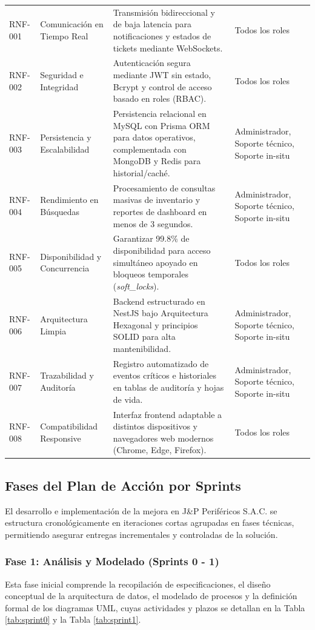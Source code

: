 \begin{longtable}{@{} >{\raggedright\arraybackslash}p{1.6cm} >{\raggedright\arraybackslash}p{2.9cm} >{\raggedright\arraybackslash}p{6.5cm} >{\raggedright\arraybackslash}p{3.8cm} @{}}
RNF-001 & Comunicación en Tiempo Real & Transmisión bidireccional y de baja latencia para notificaciones y estados de tickets mediante WebSockets. & Todos los roles \\
RNF-002 & Seguridad e Integridad & Autenticación segura mediante JWT sin estado, Bcrypt y control de acceso basado en roles (RBAC). & Todos los roles \\
RNF-003 & Persistencia y Escalabilidad & Persistencia relacional en MySQL con Prisma ORM para datos operativos, complementada con MongoDB y Redis para historial/caché. & Administrador, Soporte técnico, Soporte in-situ \\
RNF-004 & Rendimiento en Búsquedas & Procesamiento de consultas masivas de inventario y reportes de dashboard en menos de 3 segundos. & Administrador, Soporte técnico, Soporte in-situ \\
RNF-005 & Disponibilidad y Concurrencia & Garantizar 99.8\% de disponibilidad para acceso simultáneo apoyado en bloqueos temporales (\textit{soft\_locks}). & Todos los roles \\
RNF-006 & Arquitectura Limpia & Backend estructurado en NestJS bajo Arquitectura Hexagonal y principios SOLID para alta mantenibilidad. & Administrador, Soporte técnico, Soporte in-situ \\
RNF-007 & Trazabilidad y Auditoría & Registro automatizado de eventos críticos e historiales en tablas de auditoría y hojas de vida. & Administrador, Soporte técnico, Soporte in-situ \\
RNF-008 & Compatibilidad Responsive & Interfaz frontend adaptable a distintos dispositivos y navegadores web modernos (Chrome, Edge, Firefox). & Todos los roles \\
\end{longtable}
\endgroup

\subsection{Fases del Plan de Acción por Sprints}
El desarrollo e implementación de la mejora en J\&P Periféricos S.A.C. se estructura cronológicamente en iteraciones cortas agrupadas en fases técnicas, permitiendo asegurar entregas incrementales y controladas de la solución.

\subsubsection{Fase 1: Análisis y Modelado (Sprints 0 - 1)}
Esta fase inicial comprende la recopilación de especificaciones, el diseño conceptual de la arquitectura de datos, el modelado de procesos y la definición formal de los diagramas UML, cuyas actividades y plazos se detallan en la Tabla \ref{tab:sprint0} y la Tabla \ref{tab:sprint1}.

